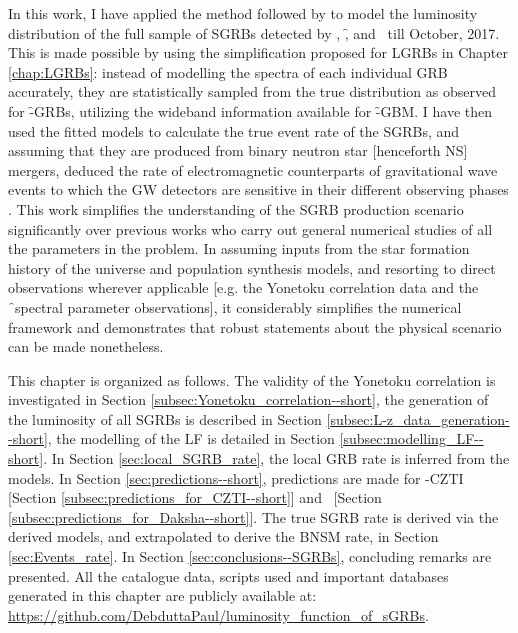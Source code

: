 In this work, I have applied the method followed by  to model the luminosity distribution of the full sample of SGRBs detected by \B, \f, and \s\ till October, 2017. This is made possible by using the simplification proposed for LGRBs in Chapter \ref{chap:LGRBs}: instead of modelling the spectra of each individual GRB accurately, they are statistically sampled from the true distribution as observed for \f -GRBs, utilizing the wideband information available for \f -GBM. I have then used the fitted models to calculate the true event rate of the SGRBs, and assuming that they are produced from binary neutron star [henceforth NS] mergers, deduced the rate of electromagnetic counterparts of gravitational wave events to which the GW detectors are sensitive in their different observing phases \citep{Abbott_et_al.-2016-review}. This work simplifies the understanding of the SGRB production scenario significantly over previous works who carry out general numerical studies of all the parameters in the problem. In assuming inputs from the star formation history of the universe and population synthesis models, and  resorting to direct observations wherever applicable [e.g. the Yonetoku correlation data and the \f\ spectral parameter observations], it considerably simplifies the numerical framework and demonstrates that robust statements about the physical scenario can be made nonetheless.

This chapter is organized as follows. The validity of the Yonetoku correlation is investigated in Section \ref{subsec:Yonetoku_correlation--short}, the generation of the luminosity of all SGRBs is described in Section \ref{subsec:L-z_data_generation--short}, the modelling of the LF is detailed in Section \ref{subsec:modelling_LF--short}. In Section \ref{sec:local_SGRB_rate}, the local GRB rate is inferred from the models. In Section \ref{sec:predictions--short}, predictions are made for \AS -CZTI [Section \ref{subsec:predictions_for_CZTI--short}] and \D\ [Section \ref{subsec:predictions_for_Daksha--short}]. The true SGRB rate is derived via the derived models, and extrapolated to derive the BNSM rate, in Section \ref{sec:Events_rate}. In Section \ref{sec:conclusions--SGRBs}, concluding remarks are presented. All the catalogue data, scripts used and important databases generated in this chapter are publicly available at: \url{https://github.com/DebduttaPaul/luminosity_function_of_sGRBs}.


